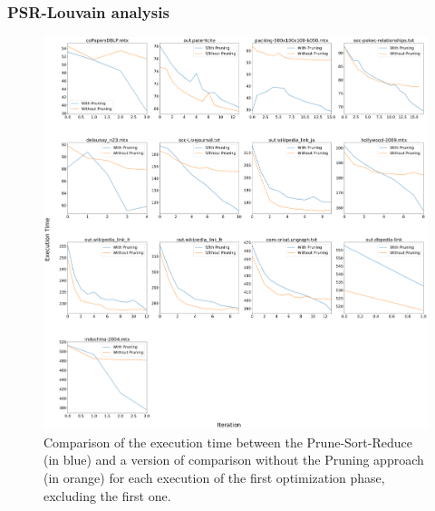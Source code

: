 \subsubsection{PSR-Louvain analysis}
\begin{figure}[h]
	\centering
	\includegraphics[width=1\linewidth]{0-resources/sort-prune-vs-no-prune}
	\caption{Comparison of the execution time between the Prune-Sort-Reduce (in blue) and a version of comparison without the Pruning approach (in orange) for each execution of the first optimization phase, excluding the first one.}
	\label{fig:prun-vs-no}
\end{figure}
